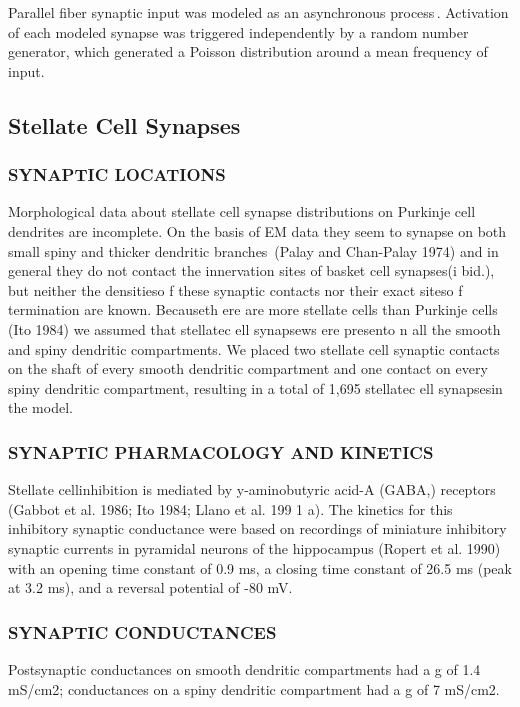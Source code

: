 \documentclass[12pt]{article}
\begin{document}
Parallel fiber synaptic input was modeled
as an asynchronous process\,\cite{Bernard:1991ye}.
Activation of each modeled synapse was triggered independently
by a random number generator, which generated a Poisson distribution
around a mean frequency of input.

\subsection*{Stellate Cell Synapses}

\subsubsection*{SYNAPTIC LOCATIONS}

Morphological data about stellate cell
synapse distributions on Purkinje cell dendrites are incomplete.
On the basis of EM data they seem to synapse on both small spiny
and thicker dendritic branches\,\cite{} (Palay and Chan-Palay 1974) and
in general they do not contact the innervation sites of basket cell
synapses(i bid.), but neither the densitieso f these synaptic contacts
nor their exact siteso f termination are known. Becauseth ere
are more stellate cells than Purkinje cells (Ito 1984) we assumed
that stellatec ell synapsews ere presento n all the smooth and spiny
dendritic compartments. We placed two stellate cell synaptic contacts
on the shaft of every smooth dendritic compartment and one
contact on every spiny dendritic compartment, resulting in a total
of 1,695 stellatec ell synapsesin the model.

\subsubsection*{SYNAPTIC PHARMACOLOGY AND KINETICS}
Stellate cellinhibition
is mediated by y-aminobutyric acid-A (GABA,) receptors
(Gabbot et al. 1986; Ito 1984; Llano et al. 199 1 a). The kinetics for
this inhibitory synaptic conductance were based on recordings of
miniature inhibitory synaptic currents in pyramidal neurons of
the hippocampus (Ropert et al. 1990) with an opening time constant
of 0.9 ms, a closing time constant of 26.5 ms (peak at 3.2
ms), and a reversal potential of -80 mV.

\subsubsection*{SYNAPTIC CONDUCTANCES}
Postsynaptic conductances on
smooth dendritic compartments had a g of 1.4 mS/cm2; conductances
on a spiny dendritic compartment had a g of 7 mS/cm2.
\end{document}
